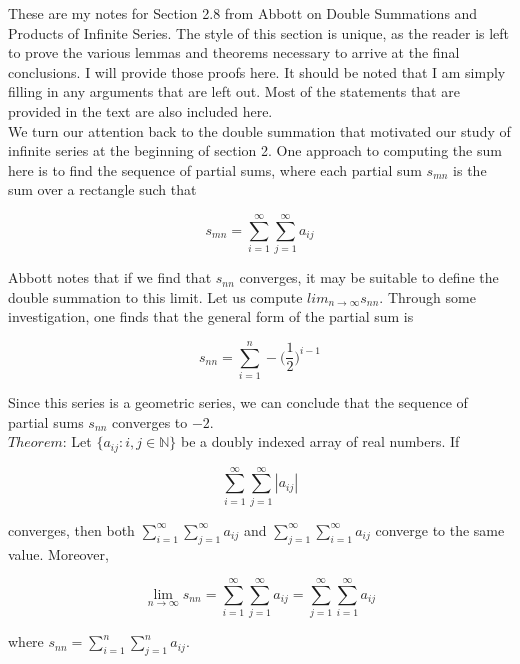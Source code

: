 \documentclass{article}
\begin{document}
These are my notes for Section 2.8 from Abbott on Double Summations and Products of Infinite Series. The style of this section is unique, as the reader is left to prove the various lemmas and theorems necessary to arrive at the final conclusions. I will provide those proofs here. It should be noted that I am simply filling in any arguments that are left out. Most of the statements that are provided in the text are also included here. \\

We turn our attention back to the double summation that motivated our study of infinite series at the beginning of section 2. One approach to computing the sum here is to find the sequence of partial sums, where each partial sum $s_{mn}$ is the sum over a rectangle such that 

\begin{equation}
    s_{mn} = \sum_{i=1}^\infty \sum_{j=1}^\infty a_{ij}
\end{equation}

Abbott notes that if we find that $s_{nn}$ converges, it may be suitable to define the double summation to this limit. Let us compute $lim_{n \to \infty} s_{nn}$. Through some investigation, one finds that the general form of the partial sum is 

\begin{equation}
    s_{nn} = \sum_{i=1}^n -\bigg(\frac{1}{2}\bigg)^{i-1}
\end{equation}

Since this series is a geometric series, we can conclude that the sequence of partial sums $s_{nn}$ converges to $-2$. \\

$Theorem$: Let $\{a_{ij} \colon i, j \in \mathbb{N}\}$ be a doubly indexed array of real numbers. If 

\begin{equation}
    \sum_{i=1}^\infty \sum_{j=1}^\infty |a_{ij}|
\end{equation}

converges, then both $\sum_{i=1}^\infty \sum_{j=1}^\infty a_{ij}$ and $\sum_{j=1}^\infty \sum_{i=1}^\infty a_{ij}$ converge to the same value. Moreover, 

\begin{equation}
    \lim_{n \to \infty} s_{nn} = \sum_{i=1}^\infty \sum_{j=1}^\infty a_{ij} = \sum_{j=1}^\infty \sum_{i=1}^\infty a_{ij}
\end{equation}

where $s_{nn} = \sum_{i=1}^n \sum_{j=1}^n a_{ij}$. \\
\end{document}
